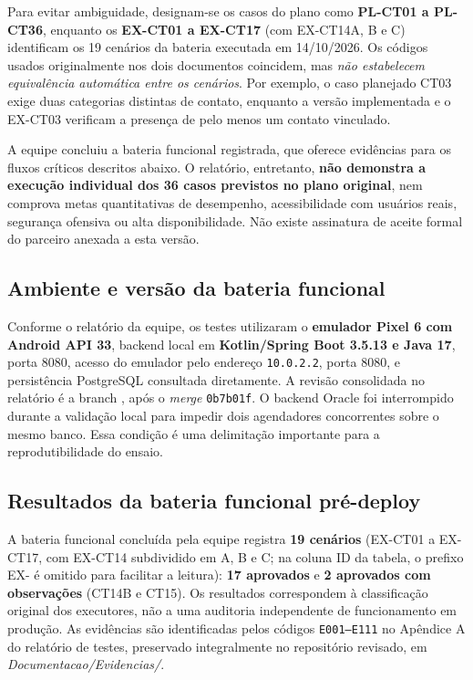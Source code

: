 Para evitar ambiguidade, designam-se os casos do plano como \textbf{PL-CT01 a PL-CT36}, enquanto os \textbf{EX-CT01 a EX-CT17} (com EX-CT14A, B e C) identificam os 19 cenários da bateria executada em 14/10/2026. Os códigos usados originalmente nos dois documentos coincidem, mas \emph{não estabelecem equivalência automática entre os cenários}. Por exemplo, o caso planejado CT03 exige duas categorias distintas de contato, enquanto a versão implementada e o EX-CT03 verificam a presença de pelo menos um contato vinculado.

A equipe concluiu a bateria funcional registrada, que oferece evidências para os fluxos críticos descritos abaixo. O relatório, entretanto, \textbf{não demonstra a execução individual dos 36 casos previstos no plano original}, nem comprova metas quantitativas de desempenho, acessibilidade com usuários reais, segurança ofensiva ou alta disponibilidade. Não existe assinatura de aceite formal do parceiro anexada a esta versão.

\subsection{Ambiente e versão da bateria funcional}

Conforme o relatório da equipe, os testes utilizaram o \textbf{emulador Pixel 6 com Android API 33}, backend local em \textbf{Kotlin/Spring Boot 3.5.13 e Java 17}, porta 8080, acesso do emulador pelo endereço \texttt{10.0.2.2}, porta 8080, e persistência PostgreSQL consultada diretamente. A revisão consolidada no relatório é a branch , após o \textit{merge} \texttt{0b7b01f}. O backend Oracle foi interrompido durante a validação local para impedir dois agendadores concorrentes sobre o mesmo banco. Essa condição é uma delimitação importante para a reprodutibilidade do ensaio.

\subsection{Resultados da bateria funcional pré-deploy}

A bateria funcional concluída pela equipe registra \textbf{19 cenários} (EX-CT01 a EX-CT17, com EX-CT14 subdividido em A, B e C; na coluna ID da tabela, o prefixo EX- é omitido para facilitar a leitura): \textbf{17 aprovados} e \textbf{2 aprovados com observações} (CT14B e CT15). Os resultados correspondem à classificação original dos executores, não a uma auditoria independente de funcionamento em produção. As evidências são identificadas pelos códigos \texttt{E001--E111} no Apêndice A do relatório de testes, preservado integralmente no repositório revisado, em \emph{Documentacao/Evidencias/}.

